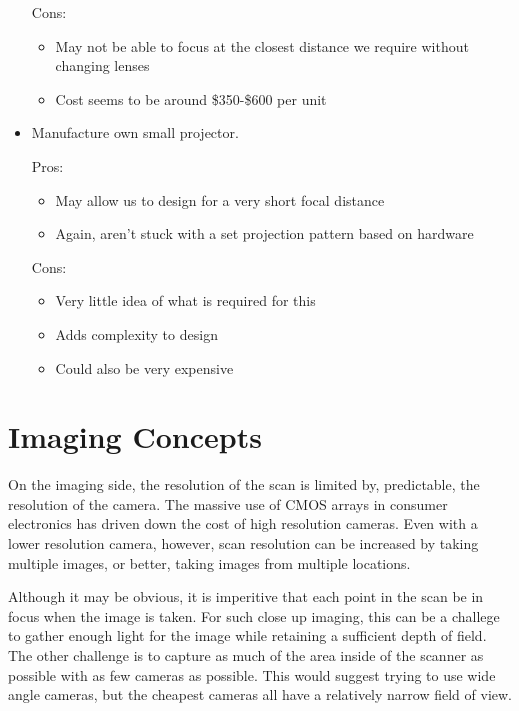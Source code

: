 \documentclass[10pt]{article}
\begin{document}
\begin{itemize}
Cons:
\begin{itemize}
\item May not be able to focus at the closest distance we require without changing lenses
\item Cost seems to be around \$350-\$600 per unit
\end{itemize}

\item Manufacture own small projector.

Pros:
\begin{itemize}
\item May allow us to design for a very short focal distance
\item Again, aren't stuck with a set projection pattern based on hardware
\end{itemize}

Cons:
\begin{itemize}
\item Very little idea of what is required for this
\item Adds complexity to design
\item Could also be very expensive
\end{itemize}
\end{itemize}

\section{Imaging Concepts}
On the imaging side, the resolution of the scan is limited by, predictable, the resolution of the camera. The massive use of CMOS arrays in consumer electronics has driven down the cost of high resolution cameras.  Even with a lower resolution camera, however, scan resolution can be increased by taking multiple images, or better, taking images from multiple locations.

Although it may be obvious, it is imperitive that each point in the scan be in focus when the image is taken. For such close up imaging, this can be a challege to gather enough light for the image while retaining a sufficient depth of field. The other challenge is to capture as much of the area inside of the scanner as possible with as few cameras as possible. This would suggest trying to use wide angle cameras, but the cheapest cameras all have a relatively narrow field of view.
\end{document}
